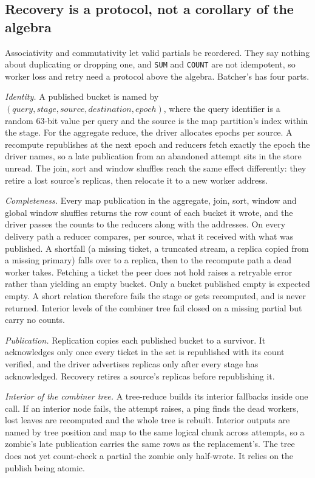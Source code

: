\documentclass[10pt,twocolumn,letterpaper]{article}   %
\newcommand{\sys}{Batcher}
\begin{document}
\subsection{Recovery is a protocol, not a corollary of the algebra}
\label{sec:recovery}

Associativity and commutativity let valid partials be reordered. They say nothing about
duplicating or dropping one, and \texttt{SUM} and \texttt{COUNT} are not idempotent, so worker
loss and retry need a protocol above the algebra. \sys{}'s has four parts.

\emph{Identity.} A published bucket is named by
$(\mathit{query}, \mathit{stage}, \mathit{source}, \mathit{destination}, \mathit{epoch})$,
where the query identifier is a random 63-bit value per query and the source is the map
partition's index within the stage. For the aggregate reduce, the driver allocates epochs per
source. A recompute republishes at the next epoch and reducers fetch exactly the epoch the
driver names, so a late publication from an abandoned attempt sits in the store unread. The
join, sort and window shuffles reach the same effect differently: they retire a lost source's
replicas, then relocate it to a new worker address.

\emph{Completeness.} Every map publication in the aggregate, join, sort, window and global
window shuffles returns the row count of each bucket it wrote, and the driver passes the counts
to the reducers along with the addresses. On every delivery path a reducer compares, per
source, what it received with what was published. A shortfall (a missing ticket, a truncated
stream, a replica copied from a missing primary) falls over to a replica, then to the recompute
path a dead worker takes. Fetching a ticket the peer does not hold raises a retryable error
rather than yielding an empty bucket. Only a bucket published empty is expected empty. A short
relation therefore fails the stage or gets recomputed, and is never returned. Interior levels
of the combiner tree fail closed on a missing partial but carry no counts.

\emph{Publication.} Replication copies each published bucket to a survivor. It acknowledges
only once every ticket in the set is republished with its count verified, and the driver
advertises replicas only after every stage has acknowledged. Recovery retires a source's
replicas before republishing it.

\emph{Interior of the combiner tree.} A tree-reduce builds its interior fallbacks inside one
call. If an interior node fails, the attempt raises, a ping finds the dead workers, lost leaves
are recomputed and the whole tree is rebuilt. Interior outputs are named by tree position and
map to the same logical chunk across attempts, so a zombie's late publication carries the same
rows as the replacement's. The tree does not yet count-check a partial the zombie only
half-wrote. It relies on the publish being atomic.
\end{document}
